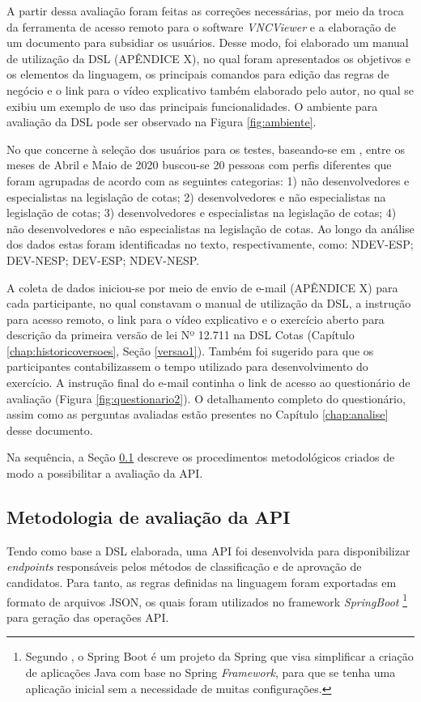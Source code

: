  A partir dessa avaliação foram feitas as correções necessárias, por meio da troca da ferramenta de acesso remoto para o software \textit{VNCViewer} e a elaboração de um documento para subsidiar os usuários. Desse modo, foi elaborado um manual de utilização da DSL (APÊNDICE X), no qual foram apresentados os objetivos e os elementos da linguagem, os principais comandos para edição das regras de negócio e o link para o vídeo explicativo também elaborado pelo autor, no qual se exibiu um exemplo de uso das principais funcionalidades. O ambiente para avaliação da DSL pode ser observado na Figura \ref{fig:ambiente}.
 
 
  
 
 No que concerne à seleção dos usuários para os testes, baseando-se em , entre os meses de Abril e Maio de 2020 buscou-se 20 pessoas com perfis diferentes que foram agrupadas de acordo com as seguintes categorias: 1) não desenvolvedores e especialistas na legislação de cotas; 2) desenvolvedores e não especialistas na legislação de cotas; 3) desenvolvedores e especialistas na legislação de cotas; 4) não desenvolvedores e não especialistas na legislação de cotas. Ao longo da análise dos dados estas foram identificadas no texto, respectivamente, como: NDEV-ESP; DEV-NESP; DEV-ESP; NDEV-NESP. 

 A coleta de dados iniciou-se por meio de envio de e-mail (APÊNDICE X) para cada participante, no qual constavam o manual de utilização da DSL, a instrução para acesso remoto, o link para o vídeo explicativo e o exercício aberto para descrição da primeira versão de lei Nº 12.711 na DSL Cotas (Capítulo \ref{chap:historicoversoes}, Seção \ref{versao1}). Também foi sugerido para que os participantes contabilizassem o tempo utilizado para desenvolvimento do exercício. A instrução final do e-mail continha o link de acesso ao questionário de avaliação (Figura \ref{fig:questionario2}). O detalhamento completo do questionário, assim como as perguntas avaliadas estão presentes no Capítulo \ref{chap:analise} desse documento.

 
 
 \newpage
 Na sequência, a Seção \ref{metodoapi} descreve os procedimentos metodológicos criados de modo a possibilitar a avaliação da \gls{API}.
 

\subsection{Metodologia de avaliação da API}
\label{metodoapi}
Tendo como base a DSL elaborada, uma \gls{API} foi desenvolvida para disponibilizar \textit{endpoints} responsáveis pelos métodos de classificação e de aprovação de candidatos. Para tanto, as regras definidas na linguagem foram exportadas em formato de arquivos JSON, os quais foram utilizados no framework \textit{SpringBoot} \footnote{Segundo , o Spring Boot é um projeto da Spring que visa simplificar a criação de aplicações Java com base no Spring \textit{Framework}, para que se tenha uma aplicação inicial sem a necessidade de muitas configurações.} para geração das operações \gls{API}. 

